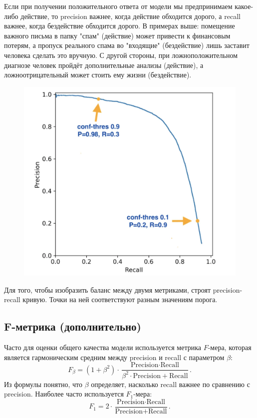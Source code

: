 Если при получении положительного ответа от модели мы предпринимаем какое-либо действие, то precision важнее, когда действие обходится дорого, а recall важнее, когда бездействие обходится дорого. В примерах выше: помещение важного письма в папку "спам" (действие) может привести к финансовым потерям, а пропуск реального спама во "входящие" (бездействие) лишь заставит человека сделать это вручную. С другой стороны, при ложноположительном диагнозе человек пройдёт дополнительные анализы (действие), а ложноотрицательный может стоить ему жизни (бездействие).

\begin{figure}[h!!!!!!!!!!]
	\centering
	\includegraphics[width=0.65\linewidth]{chapters/model_selection/images/Precisionrecallcurve.png}
\end{figure}

\bigskip
\bigskip

Для того, чтобы изобразить баланс между двумя метриками, строят precision-recall кривую. Точки на ней соответствуют разным значениям порога.

\subsection*{F-метрика (дополнительно)}

Часто для оценки общего качества модели используется метрика $F$-мера, которая является гармоническим средним между precision и recall с параметром $\beta$:
\[
F_{\beta} = (1 + \beta^2) \cdot \frac{\text{Precision} \cdot \text{Recall}}{\beta^2 \cdot \text{Precision} + \text{Recall}}.
\]
Из формулы понятно, что $\beta$ определяет, насколько recall важнее по сравнению с precision. Наиболее часто используется $F_1$-мера:
\[
F_1 = 2 \cdot \frac{\text{Precision} \cdot \text{Recall}}{\text{Precision} + \text{Recall}}.
\]


